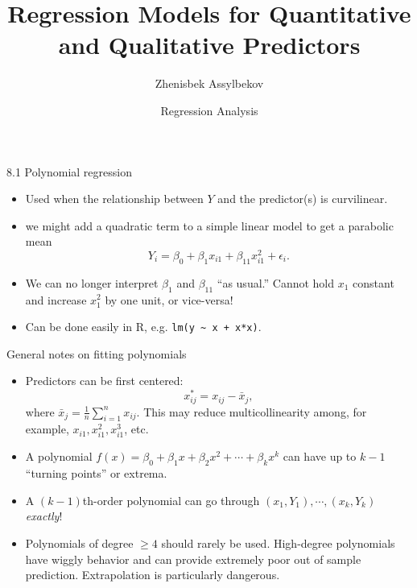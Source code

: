 \documentclass{beamer}
\title{Regression Models for Quantitative and Qualitative Predictors}
\author{Zhenisbek Assylbekov}
\institute{Department of Mathematics}
\date{Regression Analysis}
\begin{document}
\begin{frame}
  \titlepage
\end{frame}

\begin{frame}[fragile]{8.1 Polynomial regression}
\begin{itemize}
\item Used when the relationship between $Y$ and the predictor(s) is curvilinear.
\item\pause {} we might add a quadratic term to a simple linear
model to get a parabolic mean
$$
Y_i = \beta_0 + \beta_1 x_{i1} + \beta_{11} x_{i1}^2 + \epsilon_i.
$$
\item\pause We can no longer interpret $\beta_1$ and $\beta_{11}$ ``as usual.'' Cannot
hold $x_1$ constant and increase $x_1^2$ by one unit, or vice-versa!
\item\pause Can be done easily in {\sc R}, e.g. \verb|lm(y ~ x + x*x)|.
\end{itemize}
\end{frame}

\begin{frame}{General notes on fitting polynomials}
\begin{itemize}
\item Predictors can be first centered:
$$
x_{ij}^\ast = x_{ij} - \bar{x}_j,
$$ 
where $\bar{x}_j = \frac1n\sum_{i=1}^n x_{ij}$. \pause This may
reduce multicollinearity among, for example, $x_{i1}, x_{i1}^2, x_{i1}^3$, etc.
\item\pause  A polynomial $f(x) = \beta_0 + \beta_1 x + \beta_2 x^2 + \cdots + \beta_k x^k$ can have up to $k-1$ ``turning points'' or extrema. 
\item\pause A $(k-1)$th-order polynomial can go through $(x_1, Y_1), \cdots, (x_k, Y_k)$ \textit{exactly}!
\item\pause  Polynomials of degree $\ge4$  should rarely be used. \pause High-degree polynomials have
wiggly behavior and can provide extremely poor out of sample prediction. \pause Extrapolation is particularly dangerous.
\end{itemize}
\end{frame}
\end{document}
